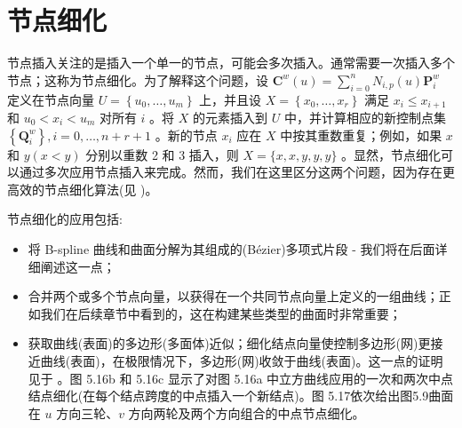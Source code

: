 \documentclass[../main.tex]{subfiles}
\begin{document}
\section{节点细化}

节点插入关注的是插入一个单一的节点，可能会多次插入。通常需要一次插入多个节点；这称为节点细化。为了解释这个问题，设 \({\mathbf{C}}^{w}\left( u\right)  = \mathop{\sum }\limits_{{i = 0}}^{n}{N}_{i,p}\left( u\right) {\mathbf{P}}_{i}^{w}\) 定义在节点向量 \(U = \left\{  {{u}_{0},\ldots ,{u}_{m}}\right\}\) 上，并且设 \(X = \left\{  {{x}_{0},\ldots ,{x}_{r}}\right\}\) 满足 \({x}_{i} \leq  {x}_{i + 1}\) 和 \({u}_{0} < {x}_{i} < {u}_{m}\) 对所有 \(i\) 。将 \(X\) 的元素插入到 \(U\) 中，并计算相应的新控制点集 \(\left\{  {\mathbf{Q}}_{i}^{w}\right\}  ,i = 0,\ldots ,n + r + 1\) 。新的节点 \({x}_{i}\) 应在 \(X\) 中按其重数重复；例如，如果 \(x\) 和 \(y\left( {x < y}\right)\) 分别以重数 2 和 3 插入，则 \(X = \{ x,x,y,y,y\}\) 。显然，节点细化可以通过多次应用节点插入来完成。然而，我们在这里区分这两个问题，因为存在更高效的节点细化算法(见 \cite{Cohe80,Boeh85a,Boeh85b,Lych85})。

节点细化的应用包括:

\begin{itemize}
\item 将 B-spline 曲线和曲面分解为其组成的(Bézier)多项式片段 - 我们将在后面详细阐述这一点；
\end{itemize}

\begin{itemize}
\item 合并两个或多个节点向量，以获得在一个共同节点向量上定义的一组曲线；正如我们在后续章节中看到的，这在构建某些类型的曲面时非常重要；
\end{itemize}



\begin{itemize}
\item 获取曲线(表面)的多边形(多面体)近似；细化结点向量使控制多边形(网)更接近曲线(表面)，在极限情况下，多边形(网)收敛于曲线(表面)。这一点的证明见于 \cite{Lane80,DeBo87}。图 5.16b 和 5.16c 显示了对图 5.16a 中立方曲线应用的一次和两次中点结点细化(在每个结点跨度的中点插入一个新结点)。图 5.17依次给出图5.9曲面在 \(u\) 方向三轮、\(v\) 方向两轮及两个方向组合的中点节点细化。
\end{itemize}
\end{document}
